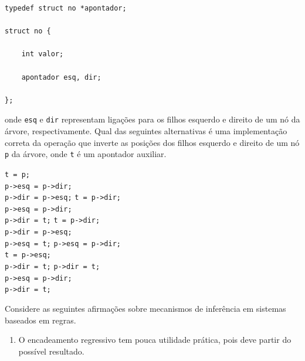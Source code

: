 \documentclass[12pt, addpoints]{exam}
\begin{document}
\begin{questions}
\begin{verbatim}
typedef struct no *apontador;

struct no {

    int valor;

    apontador esq, dir;

};

\end{verbatim}



onde \texttt{esq} e \texttt{dir} representam ligações para os filhos esquerdo e direito de um nó da árvore, respectivamente. Qual das seguintes alternativas é uma implementação correta da operação que inverte as posições dos filhos esquerdo e direito de um nó \texttt{p} da árvore, onde \texttt{t} é um apontador auxiliar.


\begin{choices}
\choice \texttt{t = p;} \\

          \texttt{p->esq = p->dir;} \\

          \texttt{p->dir = p->esq;}
\choice \texttt{t = p->dir;} \\

          \texttt{p->esq = p->dir;} \\

          \texttt{p->dir = t;}
\choice \texttt{t = p->dir;} \\

          \texttt{p->dir = p->esq;} \\

          \texttt{p->esq = t;}
\choice \texttt{p->esq = p->dir;} \\

          \texttt{t = p->esq;} \\

          \texttt{p->dir = t;}
\choice \texttt{p->dir = t;} \\

          \texttt{p->esq = p->dir;} \\

          \texttt{p->dir = t;}
\end{choices}

\question

Considere as seguintes afirmações sobre mecanismos de inferência em sistemas baseados em regras.

\begin{enumerate}[label=\Roman*.]

    \item O encadeamento regressivo tem pouca utilidade prática, pois deve partir do possível resultado.


\end{enumerate}
\end{questions}
\end{document}

